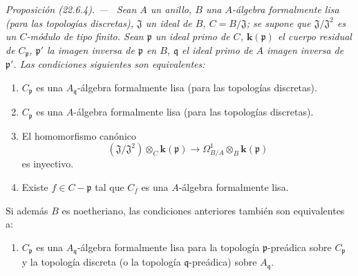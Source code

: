 \documentclass[10pt,oneside]{book}
\makeatletter
\newcommand{\setmanualcurrentlabel}[1]{\def\@currentlabel{#1}}
\newenvironment{proposition}[1][]{%
  \setmanualcurrentlabel{#1}\par\medskip\noindent\itshape Proposición (#1). ---\ }{\par}
\providecommand{\setmin}{-}%
\makeatother
\begin{document}
\begin{proposition}[22.6.4]
\label{0.22.6.4-es}
Sean $A$ un anillo, $B$ una $A$-álgebra formalmente lisa (para las
topologías discretas), $\mathfrak J$ un ideal de $B$, $C=B/\mathfrak J$; se
supone que $\mathfrak J/\mathfrak J^2$ es un $C$-módulo de tipo finito. Sean
$\mathfrak p$ un ideal primo de $C$, $\boldsymbol{k}(\mathfrak p)$ el cuerpo residual de
$C_{\mathfrak p}$, $\mathfrak p'$ la imagen inversa de $\mathfrak p$ en
$B$, $\mathfrak q$ el ideal primo de $A$ imagen inversa de $\mathfrak p'$.
Las condiciones siguientes son equivalentes:
\begin{enumerate}
  \item[\textup{a)}] $C_{\mathfrak p}$ es una $A_{\mathfrak q}$-álgebra formalmente
  lisa (para las topologías discretas).
  \item[\textup{a')}] $C_{\mathfrak p}$ es una $A$-álgebra formalmente lisa (para
  las topologías discretas).
  \item[\textup{b)}] El homomorfismo canónico
  \begin{equation}
  \label{0.22.6.4.1-es}
    (\mathfrak J/\mathfrak J^2)\otimes_C\boldsymbol k(\mathfrak p)
    \longrightarrow\Omega^1_{B/A}\otimes_B\boldsymbol k(\mathfrak p)
    \tag{22.6.4.1}
  \end{equation}
  es inyectivo.
  \item[\textup{c)}] Existe $f\in C\setmin\mathfrak p$ tal que $C_f$ es una
  $A$-álgebra formalmente lisa.
\end{enumerate}
Si además $B$ es noetheriano, las condiciones anteriores también son
equivalentes a:
\begin{enumerate}
  \item[\textup{d)}] $C_{\mathfrak p}$ es una $A_{\mathfrak q}$-álgebra formalmente
  lisa para la topología $\mathfrak p$-preádica sobre $C_{\mathfrak p}$ y la
  topología discreta (o la topología $\mathfrak q$-preádica) sobre
  $A_{\mathfrak q}$.
\end{enumerate}
\end{proposition}
\end{document}
